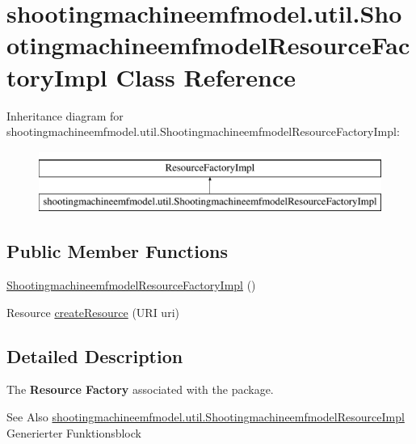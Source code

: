 \hypertarget{classshootingmachineemfmodel_1_1util_1_1_shootingmachineemfmodel_resource_factory_impl}{\section{shootingmachineemfmodel.\-util.\-Shootingmachineemfmodel\-Resource\-Factory\-Impl Class Reference}
\label{classshootingmachineemfmodel_1_1util_1_1_shootingmachineemfmodel_resource_factory_impl}
}
Inheritance diagram for shootingmachineemfmodel.\-util.\-Shootingmachineemfmodel\-Resource\-Factory\-Impl\-:\begin{figure}[H]
\begin{center}
\leavevmode
\includegraphics[height=2.000000cm]{classshootingmachineemfmodel_1_1util_1_1_shootingmachineemfmodel_resource_factory_impl}
\end{center}
\end{figure}
\subsection*{Public Member Functions}
\begin{DoxyCompactItemize}
\item 
\hyperlink{classshootingmachineemfmodel_1_1util_1_1_shootingmachineemfmodel_resource_factory_impl_a38753f9ad68e76c2cbb3f8edc163655f}{Shootingmachineemfmodel\-Resource\-Factory\-Impl} ()
\item 
Resource \hyperlink{classshootingmachineemfmodel_1_1util_1_1_shootingmachineemfmodel_resource_factory_impl_aa67002d8634cce31a3356840196b3905}{create\-Resource} (U\-R\-I uri)
\end{DoxyCompactItemize}


\subsection{Detailed Description}
The {\bfseries Resource Factory} associated with the package.

\begin{DoxySeeAlso}{See Also}
\hyperlink{classshootingmachineemfmodel_1_1util_1_1_shootingmachineemfmodel_resource_impl}{shootingmachineemfmodel.\-util.\-Shootingmachineemfmodel\-Resource\-Impl} Generierter Funktionsblock 
\end{DoxySeeAlso}


